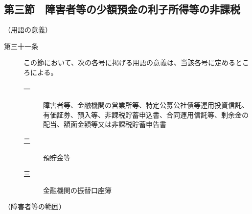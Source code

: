 \documentclass[twocolumn,a4j,10pt]{ltjtarticle}
\begin{document}
\subsection*{第三節　障害者等の少額預金の利子所得等の非課税}
\noindent\hspace{10pt}（用語の意義）
\begin{description}
\item[第三十一条]この節において、次の各号に掲げる用語の意義は、当該各号に定めるところによる。
\begin{description}
\item[一]障害者等、金融機関の営業所等、特定公募公社債等運用投資信託、有価証券、預入等、非課税貯蓄申込書、合同運用信託等、剰余金の配当、額面金額等又は非課税貯蓄申告書
\item[二]預貯金等
\item[三]金融機関の振替口座簿
\end{description}
\end{description}
\noindent\hspace{10pt}（障害者等の範囲）
\end{document}
